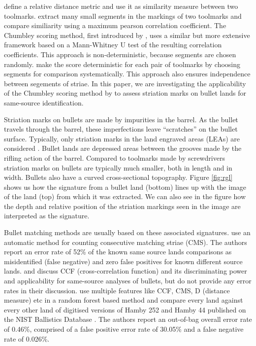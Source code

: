 \documentclass[12pt]{article}
\begin{document}
\citet{manytoolmarks2} define a relative distance metric and use it as
similarity measure between two toolmarks. \citet{manytoolmarks1} extract
many small segments in the markings of two toolmarks and compare
similiarity using a maximum pearson correlation coefficient. The
Chumbley scoring method, first introduced by \citet{chumbley}, uses a
similar but more extensive framework based on a Mann-Whitney U test of
the resulting correlation coefficients. This approach is
non-deterministic, because segments are chosen randomly. \citep{hadler}
make the score deterministic for each pair of toolmarks by choosing
segments for comparison systematically. This approach also ensures
independence between segements of striae. In this paper, we are
investigating the applicability of the Chumbley scoring method by
\citet{hadler} to assess striation marks on bullet lands for same-source
identification.

Striation marks on bullets are made by impurities in the barrel. As the
bullet travels through the barrel, these imperfections leave
``scratches'' on the bullet surface. Typically, only striation marks in
the land engraved areas (LEAs) are considered \citet{afte-article1992}.
Bullet lands are depressed areas between the grooves made by the rifling
action of the barrel. Compared to toolmarks made by screwdrivers
striation marks on bullets are typically much smaller, both in length
and in width. Bullets also have a curved cross-sectional topography.
Figure \ref{fig:rgl} shows us how the signature from a bullet land
(bottom) lines up with the image of the land (top) from which it was
extracted. We can also see in the figure how the depth and relative
position of the striation markings seen in the image are interpreted as
the signature.

Bullet matching methods are usually based on these associated
signatures. \citet{chu2013} use an automatic method for counting
consecutive matching striae (CMS). The authors report an error rate of
52\% of the known same source lands comparisons as misidentified (false
negative) and zero false positives for known different source lands.
\citet{ma2004} and \citet{vorburger2011} discuss CCF (cross-correlation
function) and its discriminating power and applicability for same-source
analyses of bullets, but do not provide any error rates in their
discussion. \citet{aoas} use multiple features like CCF, CMS, D
(distance measure) etc in a random forest based method and compare every
land against every other land of digitised versions of Hamby 252 and
Hamby 44 \citep{hamby} published on the NIST Ballistics Database
\citep{nist}. The authors report an out-of-bag overall error rate of
0.46\%, comprised of a false positive error rate of 30.05\% and a false
negative rate of 0.026\%.
\end{document}
